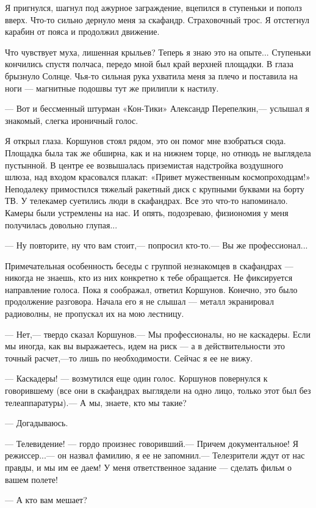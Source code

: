\documentclass[11pt,a4paper,oneside]{article}
\begin{document}
Я пригнулся, шагнул под ажурное заграждение, вцепился в ступеньки и пополз вверх. Что-то сильно дернуло меня за скафандр. Страховочный трос. Я отстегнул карабин от пояса и продолжил движение.

Что чувствует муха, лишенная крыльев? Теперь я знаю это на опыте... Ступеньки кончились спустя полчаса, передо мной был край верхней площадки. В глаза брызнуло Солнце. Чья-то сильная рука ухватила меня за плечо и поставила на ноги — магнитные подошвы тут же прилипли к настилу.

— Вот и бессменный штурман «Кон-Тики» Александр Перепелкин,— услышал я знакомый, слегка ироничный голос.

Я открыл глаза. Коршунов стоял рядом, это он помог мне взобраться сюда. Площадка была так же обширна, как и на нижнем торце, но отнюдь не выглядела пустынной. В центре ее возвышалась приземистая надстройка воздушного шлюза, над входом красовался плакат: «Привет мужественным космопроходцам!» Неподалеку примостился тяжелый ракетный диск с крупными буквами на борту ТВ. У телекамер суетились люди в скафандрах. Все это что-то напоминало. Камеры были устремлены на нас. И опять, подозреваю, физиономия у меня получилась довольно глупая...

— Ну повторите, ну что вам стоит,— попросил кто-то.— Вы же профессионал...

Примечательная особенность беседы с группой незнакомцев в скафандрах — никогда не знаешь, кто из них конкретно к тебе обращается. Не фиксируется направление голоса. Пока я соображал, ответил Коршунов. Конечно, это было продолжение разговора. Начала его я не слышал — металл экранировал радиоволны, не пропускал их на мою лестницу.

— Нет,— твердо сказал Коршунов.— Мы профессионалы, но не каскадеры. Если мы иногда, как вы выражаетесь, идем на риск — а в действительности это точный расчет,—то лишь по необходимости. Сейчас я ее не вижу.

— Каскадеры! — возмутился еще один голос. Коршунов повернулся к говорившему (все они в скафандрах выглядели на одно лицо, только этот был без телеаппаратуры).— А мы, знаете, кто мы такие?

— Догадываюсь.

— Телевидение! — гордо произнес говоривший.— Причем документальное! Я режиссер...— он назвал фамилию, я ее не запомнил.— Телезрители ждут от нас правды, и мы им ее даем! У меня ответственное задание — сделать фильм о вашем полете!

— А кто вам мешает?
\end{document}
